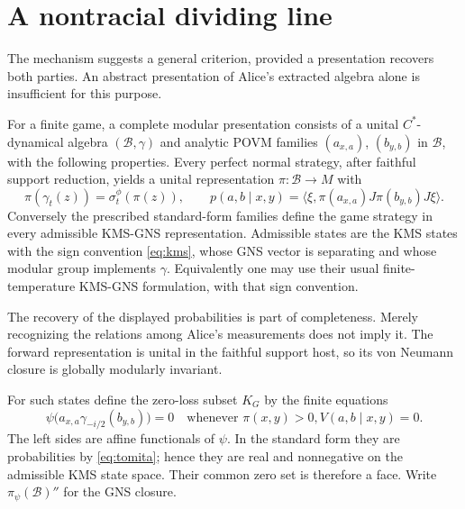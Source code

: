\section{A nontracial dividing line}\label{sec:criterion}
The mechanism suggests a general criterion, provided a presentation recovers both parties. An abstract presentation of Alice's extracted algebra alone is insufficient for this purpose.

\begin{definition}\label{def:complete}
For a finite game, a complete modular presentation consists of a unital $C^*$-dynamical algebra $(\mathcal B,\gamma)$ and analytic POVM families $(a_{x,a})$, $(b_{y,b})$ in $\mathcal B$, with the following properties. Every perfect normal strategy, after faithful support reduction, yields a unital representation $\pi:\mathcal B\to M$ with
\[
 \pi(\gamma_t(z))=\sigma_t^\phi(\pi(z)),\qquad
 p(a,b\mid x,y)=\langle\xi,\pi(a_{x,a})J\pi(b_{y,b})J\xi\rangle.
\]
Conversely the prescribed standard-form families define the game strategy in every admissible KMS-GNS representation. Admissible states are the KMS states with the sign convention \eqref{eq:kms}, whose GNS vector is separating and whose modular group implements $\gamma$. Equivalently one may use their usual finite-temperature KMS-GNS formulation, with that sign convention.
\end{definition}
The recovery of the displayed probabilities is part of completeness. Merely recognizing the relations among Alice's measurements does not imply it. The forward representation is unital in the faithful support host, so its von Neumann closure is globally modularly invariant.

For such states define the zero-loss subset $K_G$ by the finite equations
\begin{equation}\label{eq:face}
 \psi\bigl(a_{x,a}\gamma_{-i/2}(b_{y,b})\bigr)=0
 \quad\text{whenever }\pi(x,y)>0, V(a,b\mid x,y)=0.
\end{equation}
The left sides are affine functionals of $\psi$. In the standard form they are probabilities by \eqref{eq:tomita}; hence they are real and nonnegative on the admissible KMS state space. Their common zero set is therefore a face. Write $\pi_\psi(\mathcal B)''$ for the GNS closure.

